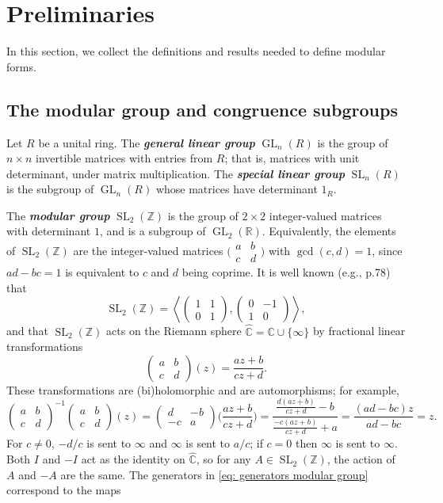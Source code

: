 \documentclass[10pt,leqno]{article}
\newcommand{\textib}[1]{\textbf{\textit{#1}}}
\DeclareMathOperator{\GL}{GL}
\DeclareMathOperator{\SL}{SL}
\begin{document}
\newpage\section{Preliminaries} In this section, we collect the definitions and results needed to define modular forms.
\subsection{The modular group and congruence subgroups}
Let $R$ be a unital ring. The \textib{general linear group} $\GL_n(R)$ is the group of $n\times n$ invertible matrices with entries from $R$; that is, matrices with unit determinant, under matrix multiplication. The \textib{special linear group} $\SL_n(R)$ is the subgroup of $\GL_n(R)$ whose matrices have determinant $1_R$.

The \textib{modular group} $\SL_2(\mathbb{Z})$ is the group of $2\times 2$ integer-valued matrices with determinant $1$, and is a subgroup of $\GL_2(\mathbb{R})$. Equivalently, the elements of $\SL_2(\mathbb{Z})$ are the integer-valued matrices $\big(\!\begin{smallmatrix}
    a & b \\ c & d
\end{smallmatrix}\!\big)$ with $\gcd(c,d) = 1$, since $ad-bc = 1$ is equivalent to $c$ and $d$ being coprime. It is well known (e.g., \cite{serre} p.78) that 
\begin{equation}\label{eq: generators modular group}
    \SL_2(\mathbb{Z}) = \left\langle\begin{pmatrix}
        1 & 1 \\ 0 & 1
    \end{pmatrix}, \begin{pmatrix}
        0 & -1 \\ 1 & 0
    \end{pmatrix}\right\rangle, 
\end{equation}
and that $\SL_2(\mathbb{Z})$ acts on the Riemann sphere $\widehat{\mathbb{C}} = \mathbb{C}\cup \{\infty\}$ by fractional linear transformations
\[\begin{pmatrix}
    a & b \\ c & d
\end{pmatrix}(z) = \frac{az + b}{cz + d}.\] These transformations are (bi)holomorphic and are automorphisms; for example, \[\begin{pmatrix}
    a & b \\ c & d
\end{pmatrix}^{-1}\begin{pmatrix}
    a & b \\ c & d
\end{pmatrix}(z) = \begin{pmatrix}
    d & -b \\ -c & a
\end{pmatrix}\Big(\frac{az+b}{cz+d}\Big) = \frac{\frac{d(az+b)}{cz+d}- b}{\frac{-c(az+b)}{cz+d}+a} = \frac{(ad-bc)z}{ad-bc} = z.\] For $c\neq 0$, $-d/c$ is sent to $\infty$ and $\infty$ is sent to $a/c$; if $c = 0$ then $\infty$ is sent to $\infty$. Both $I$ and $-I$ act as the identity on $\widehat{\mathbb{C}}$, so for any $A\in \SL_2(\mathbb{Z})$, the action of $A$ and $-A$ are the same. The generators in \cref{eq: generators modular group} correspond to the maps
\end{document}
